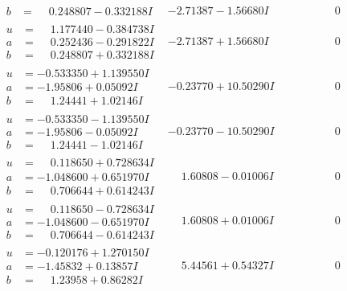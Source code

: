 \documentclass[1p]{elsarticle_modified}
\theoremstyle{definition}
\begin{document}
$$\begin{array}{c|c|c}
\begin{aligned}
b &= \phantom{-}0.248807 - 0.332188 I\end{aligned}
 & -2.71387 - 1.56680 I & \phantom{-0.000000 } 0 \\ \hline\begin{aligned}
u &= \phantom{-}1.177440 - 0.384738 I \\
a &= \phantom{-}0.252436 - 0.291822 I \\
b &= \phantom{-}0.248807 + 0.332188 I\end{aligned}
 & -2.71387 + 1.56680 I & \phantom{-0.000000 } 0 \\ \hline\begin{aligned}
u &= -0.533350 + 1.139550 I \\
a &= -1.95806 + 0.05092 I \\
b &= \phantom{-}1.24441 + 1.02146 I\end{aligned}
 & -0.23770 + 10.50290 I & \phantom{-0.000000 } 0 \\ \hline\begin{aligned}
u &= -0.533350 - 1.139550 I \\
a &= -1.95806 - 0.05092 I \\
b &= \phantom{-}1.24441 - 1.02146 I\end{aligned}
 & -0.23770 - 10.50290 I & \phantom{-0.000000 } 0 \\ \hline\begin{aligned}
u &= \phantom{-}0.118650 + 0.728634 I \\
a &= -1.048600 + 0.651970 I \\
b &= \phantom{-}0.706644 + 0.614243 I\end{aligned}
 & \phantom{-}1.60808 - 0.01006 I & \phantom{-0.000000 } 0 \\ \hline\begin{aligned}
u &= \phantom{-}0.118650 - 0.728634 I \\
a &= -1.048600 - 0.651970 I \\
b &= \phantom{-}0.706644 - 0.614243 I\end{aligned}
 & \phantom{-}1.60808 + 0.01006 I & \phantom{-0.000000 } 0 \\ \hline\begin{aligned}
u &= -0.120176 + 1.270150 I \\
a &= -1.45832 + 0.13857 I \\
b &= \phantom{-}1.23958 + 0.86282 I\end{aligned}
 & \phantom{-}5.44561 + 0.54327 I & \phantom{-0.000000 } 0 \\ \hline\begin{aligned}

\end{aligned}
\end{array}$$
\end{document}
